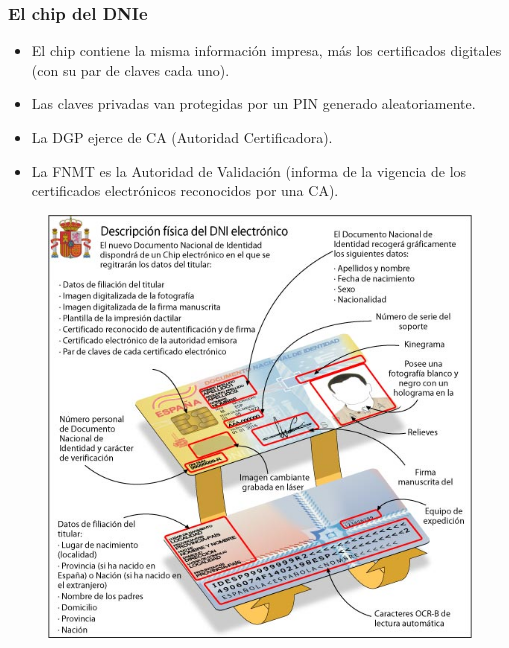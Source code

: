 \documentclass{beamer}
\begin{document}

\begin{frame}
\frametitle{El chip del DNIe}

\begin{itemize}
\item El chip contiene la misma información impresa, más los certificados digitales (con su par de claves cada uno).
\item Las claves privadas van protegidas por un PIN generado aleatoriamente.
\item La DGP ejerce de CA (Autoridad Certificadora).
\item La FNMT es la Autoridad de Validación (informa de la vigencia de los certificados electrónicos reconocidos por una CA).

\end{itemize}

\end{frame}



\begin{frame}


\begin{figure}[h]

\begin{center}
  \centering
	\includegraphics[scale=0.35,clip=true]{figs/dnie_descrip.jpg} 
\end{center}
\end{figure}

\end{frame}
\end{document}
